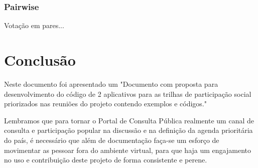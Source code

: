 \documentclass[12pt]{article}
\newcommand{\ProductDescription}{"Documento com proposta para desenvolvimento
        do código de 2 aplicativos para as trilhas de participação social
        priorizados nas reuniões do projeto contendo exemplos e códigos."
}
\begin{document}
\subsubsection{Pairwise}

Votação em pares...

\section{Conclusão}

Neste documento foi apresentado um \ProductDescription

Lembramos que para tornar o Portal de Consulta Pública realmente um canal de
consulta e participação popular na discussão e na definição da agenda
prioritária do país, é necessário que além de documentação faça-se um esforço
de movimentar as pessoar fora do ambiente virtual, para que haja um
engajamento no uso e contribuição deste projeto de forma consistente e perene.

\newpage

\newpage
\listoffigures
\newpage
\printglossary[type=\acronymtype,title=Abreviações]
\newpage
\appendix
\end{document}

